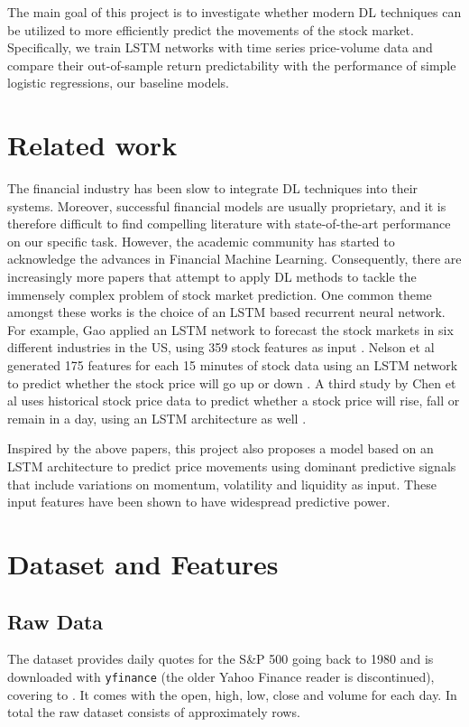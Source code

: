 \documentclass[10pt]{article}
\begin{document}
The main goal of this project is to investigate whether modern DL techniques can be
utilized to more efficiently predict the movements of the stock market.
Specifically, we train LSTM networks with time series price-volume data and compare
their out-of-sample return predictability with the performance of simple logistic
regressions, our baseline models.

\section{Related work}

The financial industry has been slow to integrate DL techniques into their
systems. Moreover, successful financial models are usually proprietary, and it is
therefore difficult to find compelling literature with state-of-the-art
performance on our specific task. However, the academic community has started to
acknowledge the advances in Financial Machine Learning. Consequently, there are
increasingly more papers that attempt to apply DL methods to tackle the immensely
complex problem of stock market prediction. One common theme amongst these works
is the choice of an LSTM based recurrent neural network. For example, Gao applied
an LSTM network to forecast the stock markets in six different industries in the
US, using 359 stock features as input \cite{gao}. Nelson et al generated 175
features for each 15 minutes of stock data using an LSTM network to predict whether
the stock price will go up or down \cite{nelson}. A third study by Chen et al uses
historical stock price data to predict whether a stock price will rise, fall or
remain in a day, using an LSTM architecture as well \cite{chen}.

Inspired by the above papers, this project also proposes a model based on an LSTM
architecture to predict price movements using dominant predictive signals that
include variations on momentum, volatility and liquidity as input. These input
features have been shown to have widespread predictive power.

\section{Dataset and Features}

\subsection{Raw Data}

The dataset provides daily quotes for the S\&P 500 going back to 1980 and is
downloaded with \texttt{yfinance} (the older Yahoo Finance reader is discontinued),
covering \dataStart{} to \dataEnd{}. It comes with the open, high, low, close and
volume for each day. In total the raw dataset consists of approximately
\nRawRows{} rows.
\end{document}
